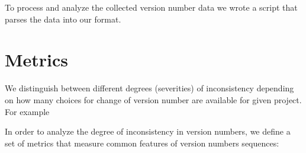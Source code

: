 \documentclass[conference]{IEEEtran}
\begin{document}
 
 
 To process and analyze the collected version number data we wrote a script that parses the data into our format. 












\section{Metrics}

We distinguish between different degrees (severities) of inconsistency depending on how many choices for change of version number are available for given project. For example 

In order to analyze the degree of inconsistency in version numbers, we define 
a set of metrics that measure common features of version numbers sequences: 
 
\end{document}
